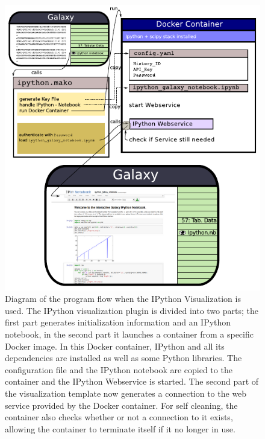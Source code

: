 \documentclass{bioinfo}
\begin{document}
\begin{methods}
\begin{figure}[!tpb]
\centerline{\includegraphics{diagram.pdf}}
\caption{Diagram of the program flow when the IPython Visualization is used. The IPython visualization plugin is divided into two parts; the first part generates initialization information and an IPython notebook, in the second part it launches a container from a specific Docker image. In this Docker container, IPython and all its dependencies are installed as well as some Python libraries. The configuration file and the IPython notebook are copied to the container and the IPython Webservice is started. The second part of the visualization template now generates a connection to the web service provided by the Docker container. For self cleaning, the container also checks whether or not a connection to it exists, allowing the container to terminate itself if it no longer in use.}
\label{fig:diagram}
\end{figure}


\end{methods}


%
%
\end{document}
